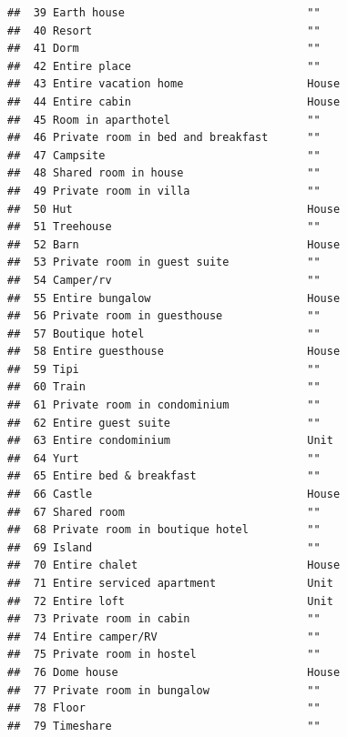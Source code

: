 \documentclass[]{article}
\begin{document}
\begin{verbatim}
##  39 Earth house                            ""               
##  40 Resort                                 ""               
##  41 Dorm                                   ""               
##  42 Entire place                           ""               
##  43 Entire vacation home                   House            
##  44 Entire cabin                           House            
##  45 Room in aparthotel                     ""               
##  46 Private room in bed and breakfast      ""               
##  47 Campsite                               ""               
##  48 Shared room in house                   ""               
##  49 Private room in villa                  ""               
##  50 Hut                                    House            
##  51 Treehouse                              ""               
##  52 Barn                                   House            
##  53 Private room in guest suite            ""               
##  54 Camper/rv                              ""               
##  55 Entire bungalow                        House            
##  56 Private room in guesthouse             ""               
##  57 Boutique hotel                         ""               
##  58 Entire guesthouse                      House            
##  59 Tipi                                   ""               
##  60 Train                                  ""               
##  61 Private room in condominium            ""               
##  62 Entire guest suite                     ""               
##  63 Entire condominium                     Unit             
##  64 Yurt                                   ""               
##  65 Entire bed & breakfast                 ""               
##  66 Castle                                 House            
##  67 Shared room                            ""               
##  68 Private room in boutique hotel         ""               
##  69 Island                                 ""               
##  70 Entire chalet                          House            
##  71 Entire serviced apartment              Unit             
##  72 Entire loft                            Unit             
##  73 Private room in cabin                  ""               
##  74 Entire camper/RV                       ""               
##  75 Private room in hostel                 ""               
##  76 Dome house                             House            
##  77 Private room in bungalow               ""               
##  78 Floor                                  ""               
##  79 Timeshare                              ""               

\end{verbatim}
\end{document}
